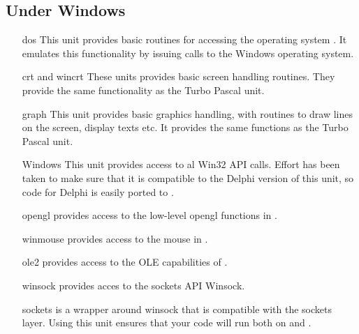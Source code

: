 \documentclass{report}
\begin{document}
%
%
\subsection{Under Windows}
\begin{itemize}
\item [dos] This unit provides basic routines for
accessing the operating system \dos. It emulates this functionality
by issuing calls to the Windows operating system.
\item [crt and wincrt] These units provides basic screen handling routines.
They provide the same functionality as the Turbo Pascal  unit.
\item [graph] This unit provides basic graphics
handling, with routines to draw lines on the screen, display texts etc. It
provides the same functions as the Turbo Pascal unit.
\item [Windows] This unit provides access to al Win32 API calls. Effort has
been taken to make sure that it is compatible to the Delphi version of this
unit, so code for Delphi is easily ported to \fpc.
\item[opengl] provides access to the low-level opengl functions in \windows.
\item[winmouse] provides access to the mouse in \windows.
\item[ole2] provides access to the OLE capabilities of \windows.
\item[winsock] provides acces to the \windows sockets API Winsock.
\item[sockets] is a wrapper around winsock that is compatible with the
\linux sockets layer. Using this unit ensures that your code will run
both on \windows and \linux.
\end{itemize}

%
%
\end{document}
